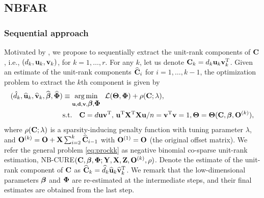 \documentclass[12pt]{article}
\def\trans{^{\rm T}}
\newcommand{\bbL}{\mathcal{L}}
\DeclareMathOperator*{\argmin}{arg\,min}
\newcommand{\bs}{\boldsymbol}
\begin{document}
%
\newpage
\subsection{NBFAR}\label{sec:snbfar}
\subsubsection{Sequential approach}\label{sec:snbfar_seq}
Motivated by \citet{mishra2017sequential}, we propose to sequentially extract the unit-rank components of ${\bf C}$, i.e., $(d_k,{\bf u}_k,{\bf v}_k)$, for $k=1,\ldots, r$. For any $k$, let us denote $\C_k = d_k\u_k\v_k\trans$.  Given an estimate of the unit-rank components $\widehat{{\bf C}}_i$ for $i = 1,\ldots,k-1$,   the optimization problem to extract the $k$th component is given by 
\begin{align}
(\hat{d}_k, \what{\u}_k, \what{\v}_k, \what{\bbeta},\what{\bPhi}) & \equiv  \argmin_{\u,\d,\v, \bbeta, \bPhi}\,\,\,  \bbL(\bs\Theta,\bPhi) +  \rho(\C; \lambda),\label{eq:prockk} \\ &\M{s.t.} \quad \C= d\u\v\trans, \, \u\trans\X\trans\X\u/n = \v\trans\v = 1, \bs\Theta = \bs\Theta(\C, \bbeta, \bO^{(k)} ), \notag %
\end{align}
where $\rho({\bf C};\lambda)$ is a sparsity-inducing penalty function with tuning parameter $\lambda$, and  ${\bf O}^{(k)} = {\bf O}+ {\bf X}\sum_{i=2}^k\widehat{{\bf C}}_{i-1}$ with ${\bf O}^{(1)} = {\bf O}$ (the original offset matrix). We refer the general problem \eqref{eq:prockk} as negative binomial co-sparse unit-rank estimation, NB-CURE$({\bf C},\mbox{\boldmath $\beta$},\mbox{\boldmath $\Phi$}; {\bf Y}, {\bf X}, {\bf Z}, {\bf O}^{(k)},  \rho)$. Denote the estimate of the   unit-rank component of ${\bf C}$ as $\what{\C}_k = \what{d}_k\what{\u}_k\what{\v}_k\trans$.  We remark that the low-dimensional parameters $\mbox{\boldmath $\beta$}$ and $\mbox{\boldmath $\Phi$}$ are re-estimated at the intermediate steps, and their final estimates are obtained from the last step.
\end{document}
